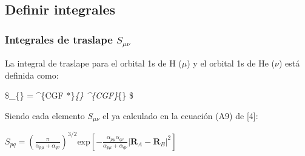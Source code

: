 \documentclass[
  letterpaper,
  DIV=11,
  numbers=noendperiod]{scrreprt}
\begin{document}
\hypertarget{definir-integrales}{%
\subsection*{Definir integrales}\label{definir-integrales}}

\hypertarget{integrales-de-traslape-s_mu-nu}{%
\subsubsection*{\texorpdfstring{Integrales de traslape
\(S_{\mu \nu}\)}{Integrales de traslape S\_\{\textbackslash mu \textbackslash nu\}}}\label{integrales-de-traslape-s_mu-nu}}

La integral de traslape para el orbital 1s de H (\(\mu\)) y el orbital
1s de He (\(\nu\)) está definida como:

\$\_\{\mu \nu\} = \int {}  \phi\^{}\{CGF
*\}\emph{\{\mu\} \phi\^{}\{CGF\}}\{\nu\} \$

Siendo cada elemento \(S_{\mu\nu}\) el ya calculado en la ecuación (A9)
de {[}4{]}:

\(S_{pq} = \left( \frac{\pi}{\alpha_{p \mu} + \alpha_{q \nu}} \right)^{3/2} \mathrm{exp}[ -\frac{\alpha_{p \mu} \alpha_{q \nu}}{\alpha_{p \mu}+ \alpha_{q \nu}} |\textbf{R}_A-\textbf{R}_B|^2]\)
\end{document}

